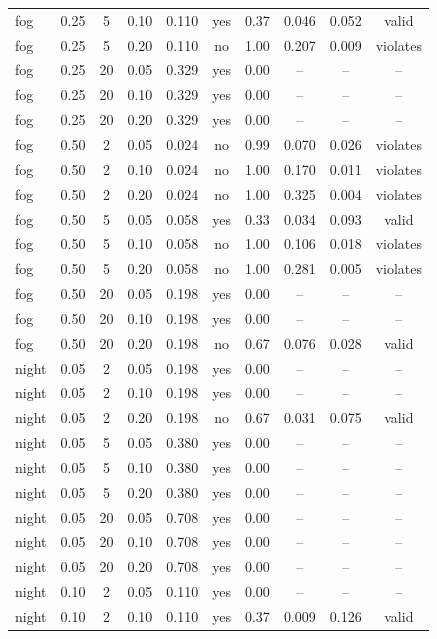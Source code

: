 \begin{table}[t]
\begin{tabular}{lccccccccc}
fog & 0.25 & 5 & 0.10 & 0.110 & yes & 0.37 & 0.046 & 0.052 & valid \\
fog & 0.25 & 5 & 0.20 & 0.110 & no & 1.00 & 0.207 & 0.009 & violates \\
fog & 0.25 & 20 & 0.05 & 0.329 & yes & 0.00 & -- & -- & -- \\
fog & 0.25 & 20 & 0.10 & 0.329 & yes & 0.00 & -- & -- & -- \\
fog & 0.25 & 20 & 0.20 & 0.329 & yes & 0.00 & -- & -- & -- \\
fog & 0.50 & 2 & 0.05 & 0.024 & no & 0.99 & 0.070 & 0.026 & violates \\
fog & 0.50 & 2 & 0.10 & 0.024 & no & 1.00 & 0.170 & 0.011 & violates \\
fog & 0.50 & 2 & 0.20 & 0.024 & no & 1.00 & 0.325 & 0.004 & violates \\
fog & 0.50 & 5 & 0.05 & 0.058 & yes & 0.33 & 0.034 & 0.093 & valid \\
fog & 0.50 & 5 & 0.10 & 0.058 & no & 1.00 & 0.106 & 0.018 & violates \\
fog & 0.50 & 5 & 0.20 & 0.058 & no & 1.00 & 0.281 & 0.005 & violates \\
fog & 0.50 & 20 & 0.05 & 0.198 & yes & 0.00 & -- & -- & -- \\
fog & 0.50 & 20 & 0.10 & 0.198 & yes & 0.00 & -- & -- & -- \\
fog & 0.50 & 20 & 0.20 & 0.198 & no & 0.67 & 0.076 & 0.028 & valid \\
night & 0.05 & 2 & 0.05 & 0.198 & yes & 0.00 & -- & -- & -- \\
night & 0.05 & 2 & 0.10 & 0.198 & yes & 0.00 & -- & -- & -- \\
night & 0.05 & 2 & 0.20 & 0.198 & no & 0.67 & 0.031 & 0.075 & valid \\
night & 0.05 & 5 & 0.05 & 0.380 & yes & 0.00 & -- & -- & -- \\
night & 0.05 & 5 & 0.10 & 0.380 & yes & 0.00 & -- & -- & -- \\
night & 0.05 & 5 & 0.20 & 0.380 & yes & 0.00 & -- & -- & -- \\
night & 0.05 & 20 & 0.05 & 0.708 & yes & 0.00 & -- & -- & -- \\
night & 0.05 & 20 & 0.10 & 0.708 & yes & 0.00 & -- & -- & -- \\
night & 0.05 & 20 & 0.20 & 0.708 & yes & 0.00 & -- & -- & -- \\
night & 0.10 & 2 & 0.05 & 0.110 & yes & 0.00 & -- & -- & -- \\
night & 0.10 & 2 & 0.10 & 0.110 & yes & 0.37 & 0.009 & 0.126 & valid \\

\end{tabular}
\end{table}
